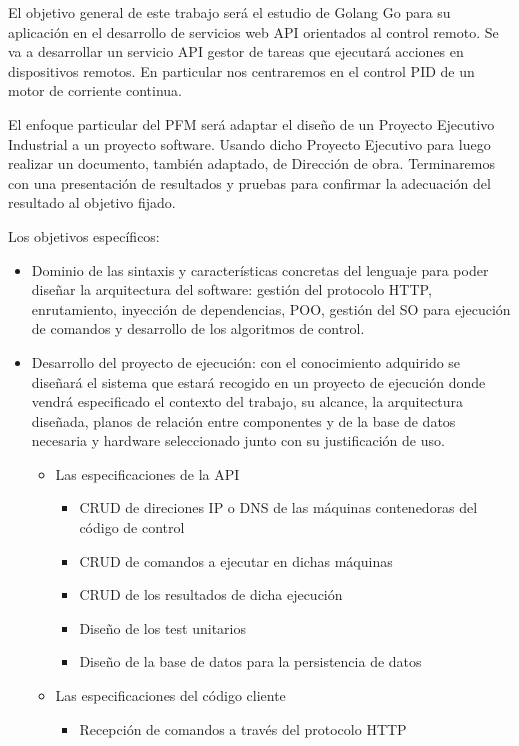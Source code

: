El objetivo general de este trabajo será el estudio de Golang Go para su aplicación en el desarrollo de servicios web API orientados al control remoto. Se va a desarrollar un servicio API gestor de tareas que ejecutará acciones en dispositivos remotos. En particular nos centraremos en el control PID de un motor de corriente continua.

El enfoque particular del PFM será adaptar el diseño de un Proyecto Ejecutivo Industrial a un proyecto software. Usando dicho Proyecto Ejecutivo para luego realizar un documento, también adaptado, de Dirección de obra. Terminaremos con una presentación de resultados y pruebas para confirmar la adecuación del resultado al objetivo fijado.

Los objetivos específicos:
\begin{itemize}
    \item Dominio de las sintaxis y características concretas del lenguaje para poder diseñar la arquitectura del software: gestión del protocolo HTTP, enrutamiento, inyección de dependencias, POO, gestión del SO para ejecución de comandos y desarrollo de los algoritmos de control.
    \item Desarrollo del proyecto de ejecución: con el conocimiento adquirido se diseñará el sistema que estará recogido en un proyecto de ejecución donde vendrá especificado el contexto del trabajo, su alcance, la arquitectura diseñada, planos de relación entre componentes y de la base de datos necesaria y hardware seleccionado junto con su justificación de uso.
    \begin{itemize}
        \item Las especificaciones de la API
        \begin{itemize}
            \item CRUD de direciones IP o DNS de las máquinas contenedoras del código de control
            \item CRUD de comandos a ejecutar en dichas máquinas
            \item CRUD de los resultados de dicha ejecución
            \item Diseño de los test unitarios
            \item Diseño de la base de datos para la persistencia de datos
        \end{itemize}
        \item Las especificaciones del código cliente
        \begin{itemize}
            \item Recepción de comandos a través del protocolo HTTP

\end{itemize}
\end{itemize}
\end{itemize}
